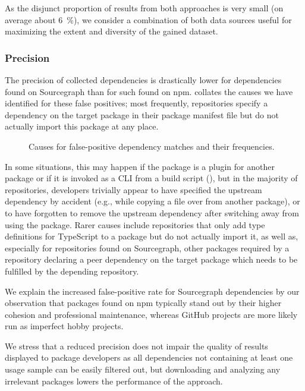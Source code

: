 As the disjunct proportion of results from both approaches is very small (on average about \SI{6}{\percent}), we consider a combination of both data sources useful for maximizing the extent and diversity of the gained dataset.

\subsubsection{Precision}
\label{sec:evaluation/resqu1/precision}

The precision of collected dependencies is drastically lower for dependencies found on Sourcegraph than for such found on npm.
 collates the causes we have identified for these false positives; most frequently, repositories specify a dependency on the target package in their package manifest file but do not actually import this package at any place.

\begin{figure}
	\centering
	\small
	
	\caption{Causes for false-positive dependency matches and their frequencies.}
	\label{fig:evaluation/resqu1/fp_causes}
\end{figure}

In some situations, this may happen if the package is a plugin for another package or if it is invoked as a CLI from a build script (), but in the majority of repositories, developers trivially appear to have specified the upstream dependency by accident (e.g., while copying a  file over from another package), or to have forgotten to remove the upstream dependency after switching away from using the package.
Rarer causes include repositories that only add type definitions for TypeScript to a package but do not actually import it, as well as, especially for repositories found on Sourcegraph, other packages required by a repository declaring a peer dependency on the target package which needs to be fulfilled by the depending repository.

We explain the increased false-positive rate for Sourcegraph dependencies by our observation that packages found on npm typically stand out by their higher cohesion and professional maintenance, whereas GitHub projects are more likely run as imperfect hobby projects.

We stress that a reduced precision does not impair the quality of results displayed to package developers as all dependencies not containing at least one
usage sample can be easily filtered out, but downloading and analyzing any irrelevant packages lowers the performance of the approach.


